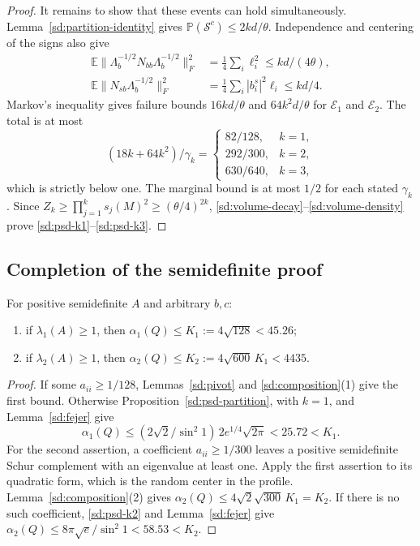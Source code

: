 \begin{proof}
It remains to show that these events can hold simultaneously.
Lemma~\ref{sd:partition-identity} gives
$\mathbb P(\mathcal S^c)\leq2kd/\theta$.
Independence and centering of the signs also give
\begin{align*}
 \mathbb E\|\Lambda_b^{-1/2}N_{bb}\Lambda_b^{-1/2}\|_F^2
 &=\tfrac14\sum_i\ell_i^2\leq kd/(4\theta),\\
 \mathbb E\|N_{sb}\Lambda_b^{-1/2}\|_F^2
 &=\tfrac14\sum_i|b_i^s|^2\ell_i\leq kd/4.
\end{align*}
Markov's inequality gives failure bounds $16kd/\theta$ and
$64k^2d/\theta$ for $\mathcal E_1$ and $\mathcal E_2$.
The total is at most
\[
 (18k+64k^2)/\gamma_k
 =
 \begin{cases}82/128,&k=1,\\292/300,&k=2,\\630/640,&k=3,\end{cases}
\]
which is strictly below one.  The marginal bound is at most
$1/2$ for each stated $\gamma_k$.
Since $Z_k\geq\prod_{j=1}^k s_j(M)^2\geq(\theta/4)^{2k}$,
\eqref{sd:volume-decay}--\eqref{sd:volume-density} prove
\eqref{sd:psd-k1}--\eqref{sd:psd-k3}.
\end{proof}

\subsection{Completion of the semidefinite proof}

\begin{proposition}\label{sd:psd-levels}
For positive semidefinite $A$ and arbitrary $b,c$:
\begin{enumerate}
\item if $\lambda_1(A)\geq1$, then
$\alpha_1(Q)\leq K_1:=4\sqrt{128}<45.26$;
\item if $\lambda_2(A)\geq1$, then
$\alpha_2(Q)\leq K_2:=4\sqrt{600}\,K_1<4435$.
\end{enumerate}
\end{proposition}

\begin{proof}
If some $a_{ii}\geq1/128$, Lemmas~\ref{sd:pivot} and
\ref{sd:composition}(1) give the first bound.
Otherwise Proposition~\ref{sd:psd-partition}, with $k=1$,
and Lemma~\ref{sd:fejer} give
\[
 \alpha_1(Q)\leq
 (2\sqrt2/\sin^2 1)\,2e^{1/4}\sqrt{2\pi}<25.72<K_1.
\]
For the second assertion, a coefficient $a_{ii}\geq1/300$ leaves
a positive semidefinite Schur complement with an eigenvalue at least
one.  Apply the first assertion to its quadratic form, which is the
random center in the profile.  Lemma~\ref{sd:composition}(2)
gives $\alpha_2(Q)\leq4\sqrt2\sqrt{300}\,K_1=K_2$.
If there is no such coefficient,
\eqref{sd:psd-k2} and Lemma~\ref{sd:fejer} give
$\alpha_2(Q)\leq8\pi\sqrt e/\sin^2 1<58.53<K_2$.
\end{proof}

